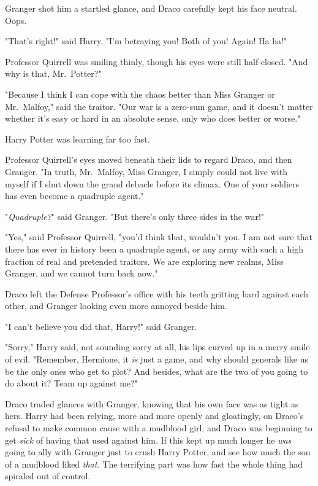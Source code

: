 Granger shot him a startled glance, and Draco carefully kept his face neutral. 
Oops.

"That's right!" said Harry. "I'm betraying you! Both of you! Again! Ha ha!"

Professor Quirrell was smiling thinly, though his eyes were still half-closed. 
"And why is that, Mr.~Potter?"

"Because I think I can cope with the chaos better than Miss Granger or 
Mr.~Malfoy," said the traitor. "Our war is a zero-sum game, and it doesn't 
matter whether it's easy or hard in an absolute sense, only who does better or 
worse."

Harry Potter was learning far too fast.

Professor Quirrell's eyes moved beneath their lids to regard Draco, and then 
Granger. "In truth, Mr.~Malfoy, Miss Granger, I simply could not live with 
myself if I shut down the grand debacle before its climax. One of your soldiers 
has even become a quadruple agent."

"\emph{Quadruple?}" said Granger. "But there's only three sides in the war!"

"Yes," said Professor Quirrell, "you'd think that, wouldn't you. I am not sure 
that there has ever in history been a quadruple agent, or any army with such a 
high fraction of real and pretended traitors. We are exploring new realms, Miss 
Granger, and we cannot turn back now."

Draco left the Defense Professor's office with his teeth gritting hard against 
each other, and Granger looking even more annoyed beside him.

"I can't believe you did that, Harry!" said Granger.

"Sorry," Harry said, not sounding sorry at all, his lips curved up in a merry 
smile of evil. "Remember, Hermione, it \emph{is} just a game, and why should 
generals like us be the only ones who get to plot? And besides, what are the 
two of you going to do about it? Team up against me?"

Draco traded glances with Granger, knowing that his own face was as tight as 
hers. Harry had been relying, more and more openly and gloatingly, on Draco's 
refusal to make common cause with a mudblood girl; and Draco was beginning to 
get \emph{sick} of having that used against him. If this kept up much longer he 
\emph{was} going to ally with Granger just to crush Harry Potter, and see how 
much the son of a mudblood liked \emph{that.}
\sbreak
The terrifying part was how fast the whole thing had spiraled out of control.

